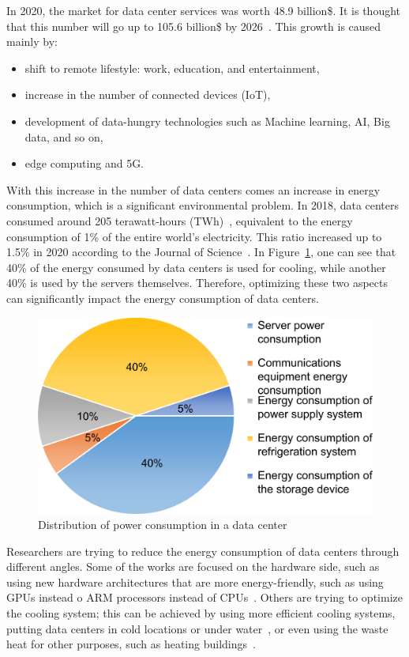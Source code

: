 In 2020, the market for data center services was worth 48.9 billion\$.
It is thought that this number will go up to 105.6 billion\$ by 2026~\cite{inshakova2022data}.
This growth is caused mainly by:
\begin{itemize}
      \item shift to remote lifestyle: work, education, and entertainment,
      \item increase in the number of connected devices (IoT),
      \item development of data-hungry technologies such as Machine learning, AI, Big data, and so on,
      \item edge computing and 5G.
\end{itemize}

With this increase in the number of data centers comes an increase in energy consumption, which is a significant environmental problem.
In 2018, data centers consumed around 205 terawatt-hours (TWh)~\cite{schneider2021world}, equivalent to the energy consumption of 1\% of the entire world's electricity.
This ratio increased up to 1.5\% in 2020 according to the Journal of Science~\cite{mytton2021data}.
In Figure~\ref{fig:data_centers_power_distribution}, one can see that 40\% of the energy consumed by data centers is used for cooling, while another 40\% is used by the servers themselves.
Therefore, optimizing these two aspects can significantly impact the energy consumption of data centers.

\begin{figure}[!h]
      \centering
      \includegraphics[width=0.6\linewidth]{chapters/data_centers_power_distribution}
      \caption{Distribution of power consumption in a data center~\cite{rong2016optimizing}}
      \label{fig:data_centers_power_distribution}
\end{figure}

Researchers are trying to reduce the energy consumption of data centers through different angles.
Some of the works are focused on the hardware side, such as using new hardware architectures that are more energy-friendly, such as using GPUs instead o ARM processors instead of CPUs~\cite{aroca2012towards}.
Others are trying to optimize the cooling system; this can be achieved by using more efficient cooling systems, putting data centers in cold locations or under water~\cite{simon2018project}, or even using the waste heat for other purposes, such as heating buildings~\cite{bouzel2021distributed,cao2021carbon}.

